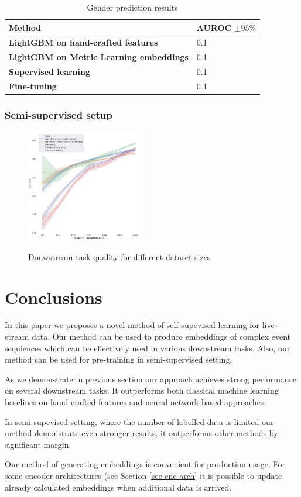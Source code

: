 \documentclass[sigconf]{acmart}
\begin{document}
\begin{table}[ht]
\caption{Gender prediction results}
\begin{tabular}{ | m{18em} |  m{6em} | }
\hline
\textbf{Method} & \textbf{AUROC $\pm 95\%$} \\
\hline
\textbf{LightGBM on hand-crafted features} & 0.1 \\
\textbf{LightGBM on Metric Learning embeddings} & 0.1 \\
\textbf{Supervised learning} & 0.1  \\
\textbf{Fine-tuning} & 0.1  \\
\hline
\end{tabular}
\label{tab-sex-pred}
\end{table}

\subsubsection{Semi-supervised setup} \label{sec-semi}

\begin{figure}[ht]
  \caption{Donwstream task quality for different dataset sizes}
  \includegraphics[width=0.46\textwidth]{figures/semi_supervised_setup.png}
  \label{fig-semi}
\end{figure}

\section{Conclusions} \label{sec-conclusions}

In this paper we proposes a novel method of self-supevised learning for live-stream data. Our method can be used to produce embeddings of complex event sequiences which can be effectively used in various downstream tasks. Also, our method can be used for pre-training in semi-supervised setting.

As we demonstrate in previous section our approach achieves strong performance on several downstream tasks. It outperforms both classical machine learning baselines on hand-crafted features and neural network based approaches.

In semi-supevised setting, where the number of labelled data is limited our method demonstrate even stronger results, it outperforms other methods by significant margin.

Our method of generating embeddings is convenient for production usage. For some encoder architectures (see Section \ref{sec-enc-arch} it is possible to update already calculated embeddings when additional data is arrived.



\end{document}
